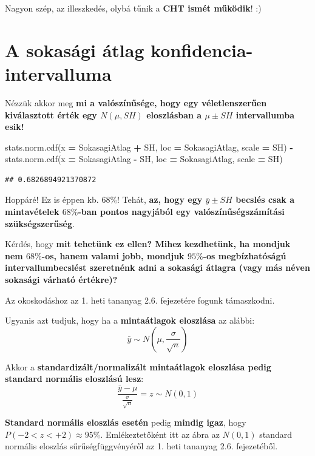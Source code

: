 \documentclass[
]{book}
\newenvironment{Shaded}{\begin{snugshade}}{\end{snugshade}}
\newcommand{\NormalTok}[1]{#1}
\newcommand{\OperatorTok}[1]{\textcolor[rgb]{0.81,0.36,0.00}{\textbf{#1}}}
\begin{document}
Nagyon szép, az illeszkedés, olybá tűnik a \textbf{CHT ismét működik}! :)

\section{A sokasági átlag konfidencia-intervalluma}\label{a-sokasuxe1gi-uxe1tlag-konfidencia-intervalluma}

Nézzük akkor meg \textbf{mi a valószínűsége, hogy egy véletlenszerűen kiválasztott érték egy \(N(\mu, SH)\) eloszlásban a \(\mu \pm SH\) intervallumba esik!}

\begin{Shaded}
\begin{Highlighting}[]
\NormalTok{stats.norm.cdf(x }\OperatorTok{=}\NormalTok{ SokasagiAtlag }\OperatorTok{+}\NormalTok{ SH, loc }\OperatorTok{=}\NormalTok{ SokasagiAtlag, scale }\OperatorTok{=}\NormalTok{ SH) }\OperatorTok{{-}}\NormalTok{ stats.norm.cdf(x }\OperatorTok{=}\NormalTok{ SokasagiAtlag }\OperatorTok{{-}}\NormalTok{ SH, loc }\OperatorTok{=}\NormalTok{ SokasagiAtlag, scale }\OperatorTok{=}\NormalTok{ SH)}
\end{Highlighting}
\end{Shaded}

\begin{verbatim}
## 0.6826894921370872
\end{verbatim}

Hoppáré! Ez is éppen kb. \(68\%\)! Tehát, \textbf{az, hogy egy \(\bar{y} \pm SH\) becslés csak a mintavételek \(68\%\)-ban pontos nagyjából egy valószínűségszámítási szükségszerűség}.

Kérdés, hogy \textbf{mit tehetünk ez ellen? Mihez kezdhetünk, ha mondjuk nem \(68\%\)-os, hanem valami jobb, mondjuk \(95\%\)-os megbízhatóságú intervallumbecslést szeretnénk adni a sokasági átlagra (vagy más néven sokasági várható értékre)?}

Az okoskodáshoz az 1. heti tananyag 2.6. fejezetére fogunk támaszkodni.

Ugyanis azt tudjuk, hogy ha a \textbf{mintaátlagok eloszlása} az alábbi: \[\bar{y} \sim N\left(\mu,\frac{\sigma}{\sqrt{n}}\right)\]

Akkor a \textbf{standardizált/normalizált mintaátlagok eloszlása pedig standard normális eloszlású lesz}: \[\frac{\bar{y}-\mu}{\frac{\sigma}{\sqrt{n}}} = z \sim N(0,1)\]

\textbf{Standard normális eloszlás esetén} pedig \textbf{mindig igaz}, hogy \(P(-2<z<+2) \approx 95\%\). Emlékeztetőként itt az ábra az \(N(0,1)\) standard normális eloszlás sűrűségfüggvényéről az 1. heti tananyag 2.6. fejezetéből.
\end{document}
